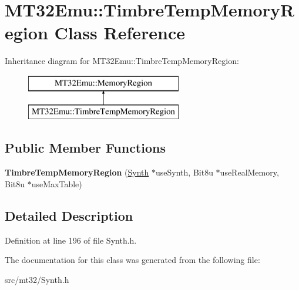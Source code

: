 \hypertarget{classMT32Emu_1_1TimbreTempMemoryRegion}{\section{M\-T32\-Emu\-:\-:Timbre\-Temp\-Memory\-Region Class Reference}
\label{classMT32Emu_1_1TimbreTempMemoryRegion}
}
Inheritance diagram for M\-T32\-Emu\-:\-:Timbre\-Temp\-Memory\-Region\-:\begin{figure}[H]
\begin{center}
\leavevmode
\includegraphics[height=2.000000cm]{classMT32Emu_1_1TimbreTempMemoryRegion}
\end{center}
\end{figure}
\subsection*{Public Member Functions}
\begin{DoxyCompactItemize}
\item 
\hypertarget{classMT32Emu_1_1TimbreTempMemoryRegion_a75e871b43a9a41a47e2ca3ce93edcc87}{{\bfseries Timbre\-Temp\-Memory\-Region} (\hyperlink{classMT32Emu_1_1Synth}{Synth} $\ast$use\-Synth, Bit8u $\ast$use\-Real\-Memory, Bit8u $\ast$use\-Max\-Table)}\label{classMT32Emu_1_1TimbreTempMemoryRegion_a75e871b43a9a41a47e2ca3ce93edcc87}

\end{DoxyCompactItemize}


\subsection{Detailed Description}


Definition at line 196 of file Synth.\-h.



The documentation for this class was generated from the following file\-:\begin{DoxyCompactItemize}
\item 
src/mt32/Synth.\-h\end{DoxyCompactItemize}
